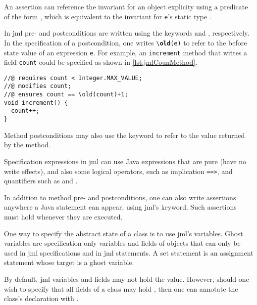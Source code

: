 An assertion can reference the invariant for an object explicity using
a predicate of the form , which is
equivalent to the invariant for \texttt{e}'s static type \cite[section
12.4.22]{Leavens&13}.

In \ac{jml} pre- and postconditions are written using the keywords
 and , respectively. In the specification of
a postcondition, one writes \texttt{\textbackslash \textbf{old}(e)} to
refer to the before state value of an expression \texttt{e}.  For
example, an \texttt{increment} method that writes a field
\texttt{count} could be specified as shown in
\autoref{lst:jmlCounMethod}.

\begin{lstlisting}[style=customJml,label={lst:jmlCounMethod},caption={Example of a \ac{jml} specification for a Java method.}]
//@ requires count < Integer.MAX_VALUE;
//@ modifies count;
//@ ensures count == \old(count)+1;
void increment() {
  count++;
}
\end{lstlisting}
Method postconditions may also use the keyword {\RESULT} to refer to
the value returned by the method.

Specification expressions in \ac{jml} can use Java expressions that
are pure (have no write effects), and also some logical operators,
such as implication \texttt{==>}, and quantifiers such as {\JMLforall}
and {\JMLexists}.

In addition to method pre- and postconditions, one can also write
assertions anywhere a Java statement can appear, using \ac{jml}'s
 keyword. Such assertions must hold whenever they are executed.

One way to specify the abstract state of a class is to use \ac{jml}'s
 variables. Ghost variables are specification-only variables
and fields of objects that can only be used in \ac{jml} specifications
and in \ac{jml}  statements. A set statement is an assignment
statement whose target is a ghost variable.

By default, \ac{jml} variables and fields may not hold the 
value. However, should one wish to specify that all fields of a class
may hold , then one can annotate the class's declaration with
.

